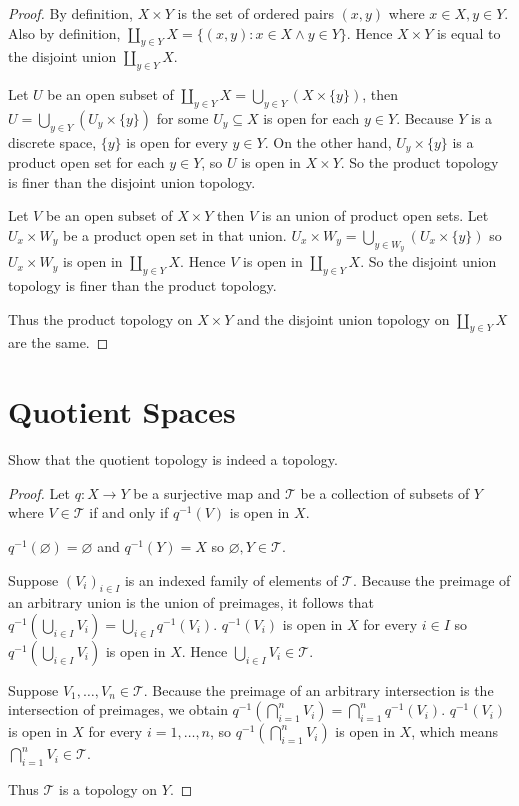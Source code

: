 \begin{proof}
    By definition, $X\times Y$ is the set of ordered pairs $(x, y)$ where $x\in X, y\in Y$. Also by definition, $\coprod_{y\in Y}X = \{ (x, y): x\in X \land y\in Y \}$. Hence $X\times Y$ is equal to the disjoint union $\coprod_{y\in Y}X$.

    Let $U$ be an open subset of $\coprod_{y\in Y}X = \bigcup_{y\in Y}(X\times\{y\})$, then $U = \bigcup_{y\in Y}(U_{y}\times \{ y \})$ for some $U_{y}\subseteq X$ is open for each $y\in Y$. Because $Y$ is a discrete space, $\{y\}$ is open for every $y\in Y$. On the other hand, $U_{y}\times\{y\}$ is a product open set for each $y\in Y$, so $U$ is open in $X\times Y$. So the product topology is finer than the disjoint union topology.

    Let $V$ be an open subset of $X\times Y$ then $V$ is an union of product open sets. Let $U_{x}\times W_{y}$ be a product open set in that union. $U_{x}\times W_{y} = \bigcup_{y\in W_{y}}(U_{x}\times\{y\})$ so $U_{x}\times W_{y}$ is open in $\coprod_{y\in Y}X$. Hence $V$ is open in $\coprod_{y\in Y}X$. So the disjoint union topology is finer than the product topology.

    Thus the product topology on $X\times Y$ and the disjoint union topology on $\coprod_{y\in Y}X$ are the same.
\end{proof}

\section*{Quotient Spaces}

\begin{exercise}{3.46}
    Show that the quotient topology is indeed a topology.
\end{exercise}

\begin{proof}
    Let $q: X\to Y$ be a surjective map and $\mathscr{T}$ be a collection of subsets of $Y$ where $V\in\mathscr{T}$ if and only if $q^{-1}(V)$ is open in $X$.

    $q^{-1}(\varnothing) = \varnothing$ and $q^{-1}(Y) = X$ so $\varnothing, Y\in\mathscr{T}$.

    Suppose ${(V_{i})}_{i\in I}$ is an indexed family of elements of $\mathscr{T}$. Because the preimage of an arbitrary union is the union of preimages, it follows that $q^{-1}\left(\bigcup_{i\in I}V_{i}\right) = \bigcup_{i\in I}q^{-1}(V_{i})$. $q^{-1}(V_{i})$ is open in $X$ for every $i\in I$ so $q^{-1}\left(\bigcup_{i\in I}V_{i}\right)$ is open in $X$. Hence $\bigcup_{i\in I}V_{i}\in \mathscr{T}$.

    Suppose $V_{1}, \ldots, V_{n}\in \mathscr{T}$. Because the preimage of an arbitrary intersection is the intersection of preimages, we obtain $q^{-1}\left(\bigcap^{n}_{i=1}V_{i}\right) = \bigcap^{n}_{i=1}q^{-1}(V_{i})$. $q^{-1}(V_{i})$ is open in $X$ for every $i=1,\ldots,n$, so $q^{-1}\left(\bigcap^{n}_{i=1}V_{i}\right)$ is open in $X$, which means $\bigcap^{n}_{i=1}V_{i}\in\mathscr{T}$.

    Thus $\mathscr{T}$ is a topology on $Y$.
\end{proof}

